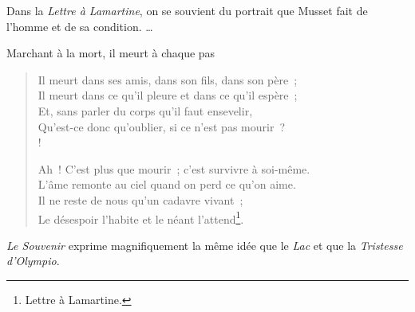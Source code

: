 \documentclass[french,twoside]{book} %
\begin{document}
\noindent Dans la \emph{Lettre à Lamartine}, on se souvient du portrait que Musset fait de l’homme et de sa condition. …\par
Marchant à la mort, il meurt à chaque pas\par


\begin{verse}
Il meurt dans ses amis, dans son fils, dans son père ;\\
Il meurt dans ce qu’il pleure et dans ce qu’il espère ;\\
Et, sans parler du corps qu’il faut ensevelir,\\
Qu’est-ce donc qu’oublier, si ce n’est pas mourir ?\\!

Ah ! C’est plus que mourir ; c’est survivre à soi-même.\\
L’âme remonte au ciel quand on perd ce qu’on aime.\\
Il ne reste de nous qu’un cadavre vivant ;\\
Le désespoir l’habite et le néant l’attend\footnote{Lettre à Lamartine.}.\\
\end{verse}

\noindent \emph{Le Souvenir }exprime magnifiquement la même idée que le \emph{Lac} et que la \emph{Tristesse d’Olympio}.\par
\end{document}
